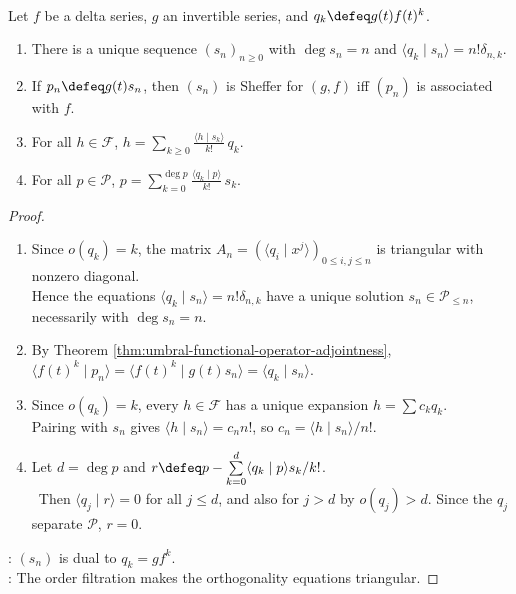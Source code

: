 \begin{theorem} \label{thm:sheffer-sequence-existence-and-expansion} \\
Let $f$ be a delta series, $g$ an invertible series, and $q_k\defeq g(t)f(t)^k$.
\begin{enumerate}[label=(\roman*)]
\setlength{\itemsep}{0pt}
\item There is a unique sequence $(s_n)_{n\geq0}$ with $\deg s_n=n$ and $\langle q_k\mid s_n\rangle=n!\delta_{n,k}$.
\item If $p_n\defeq g(t)s_n$, then $(s_n)$ is Sheffer for $(g,f)$ iff $(p_n)$ is associated with $f$.
\item For all $h\in\mathscr{F}$, $h=\sum\limits_{k\geq0}\frac{\langle h\mid s_k\rangle}{k!}\,q_k$.
\item For all $p\in\mathscr{P}$, $p=\sum\limits_{k=0}^{\deg p}\frac{\langle q_k\mid p\rangle}{k!}\,s_k$.
\end{enumerate}
\begin{proof}
\begin{enumerate}[label=(\roman*)]
\setlength{\itemsep}{0pt}
\item Since $o(q_k)=k$, the matrix $A_n=(\langle q_i\mid x^j\rangle)_{0\leq i,j\leq n}$ is triangular with nonzero diagonal.\\
Hence the equations $\langle q_k\mid s_n\rangle=n!\delta_{n,k}$ have a unique solution $s_n\in\mathscr{P}_{\leq n}$, necessarily with $\deg s_n=n$.
\item By Theorem \ref{thm:umbral-functional-operator-adjointness}, $\langle f(t)^k\mid p_n\rangle =\langle f(t)^k\mid g(t)s_n\rangle =\langle q_k\mid s_n\rangle$.
\item Since $o(q_k)=k$, every $h\in\mathscr{F}$ has a unique expansion $h=\sum c_kq_k$.\\
Pairing with $s_n$ gives $\langle h\mid s_n\rangle=c_n n!$, so $c_n=\langle h\mid s_n\rangle/n!$.
\item Let $d=\deg p$ and $r\defeq p-\sum\limits_{k=0}^{d}\langle q_k\mid p\rangle s_k/k!$.\\\
Then $\langle q_j\mid r\rangle=0$ for all $j\leq d$, and also for $j>d$ by $o(q_j)>d$. Since the $q_j$ separate $\mathscr{P}$, $r=0$.
\end{enumerate}
: $(s_n)$ is dual to $q_k=g f^k$.\\
: The order filtration makes the orthogonality equations triangular.
\end{proof}
\end{theorem}

